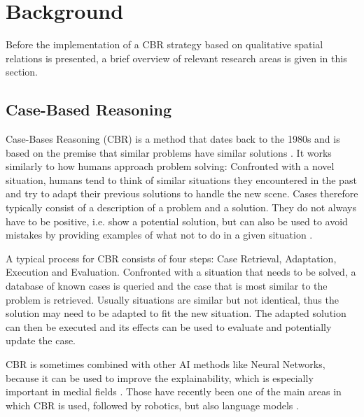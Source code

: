 \section{Background}\label{sec:background}

Before the implementation of a \ac{CBR} strategy based on qualitative spatial relations is presented, a brief overview of relevant research areas is given in this section.

\subsection{Case-Based Reasoning}
Case-Bases Reasoning (CBR) is a method that dates back to the 1980s \cite{Schank1983DynamicM} and is based on the premise that similar problems have similar solutions \cite{KI-cbr-2009}.
It works similarly to how humans approach problem solving: Confronted with a novel situation, humans tend to think of similar situations they encountered in the past and try to adapt their previous solutions to handle the new scene.
Cases therefore typically consist of a description of a problem and a solution.
They do not always have to be positive, i.e. show a potential solution, but can also be used to avoid mistakes by providing examples of what not to do in a given situation \cite{Kolodner1992}.

A typical process for \ac{CBR} consists of four steps: Case Retrieval, Adaptation, Execution and Evaluation.\cite{Kolodner1992} %
Confronted with a situation that needs to be solved, a database of known cases is queried and the case that is most similar to the problem is retrieved.
Usually situations are similar but not identical, thus the solution may need to be adapted to fit the new situation. The adapted solution can then be executed and its effects can be used to evaluate and potentially update the case.

\ac{CBR} is sometimes combined with other AI methods like Neural Networks, because it can be used to improve the explainability, which is especially important in medial fields \cite{expl-1amador2021case,expl-210.1007/978-3-030-58342-2_22,explainable-https://doi.org/10.48550/arxiv.1710.04806}.
Those have recently been one of the main areas in which CBR is used\cite{medical1, medical2}, followed by robotics\cite{QCBR}, but also language models \cite{text, text2}.


